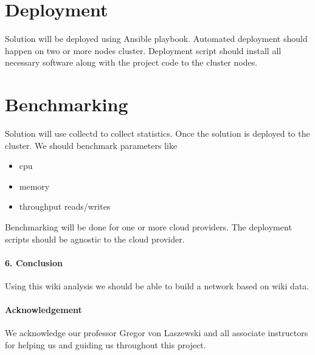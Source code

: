 \documentclass[9pt,twocolumn,twoside]{styles/osajnl}
\begin{document}
\section{Deployment}
Solution will be deployed using Ansible \cite{www-ansible} playbook. Automated deployment should happen on two or more nodes cluster. Deployment script should install all necessary software along with the project code to the cluster nodes.

\section{Benchmarking}
Solution will use collectd \cite{www-collectd} to collect statistics. Once the solution is deployed to the cluster. We should benchmark parameters like
\begin{itemize}[noitemsep]
\item cpu
\item memory
\item throughput reads/writes
\end{itemize}
Benchmarking will be done for one or more cloud providers. The deployment scripts should be agnostic to the cloud provider. 



 
\paragraph{6. Conclusion}

Using this wiki analysis we should be able to build a network based on wiki data.

\paragraph{Acknowledgement}

We acknowledge our professor Gregor von Laszewski and all associate instructors for helping us and guiding us throughout this project.
\end{document}
